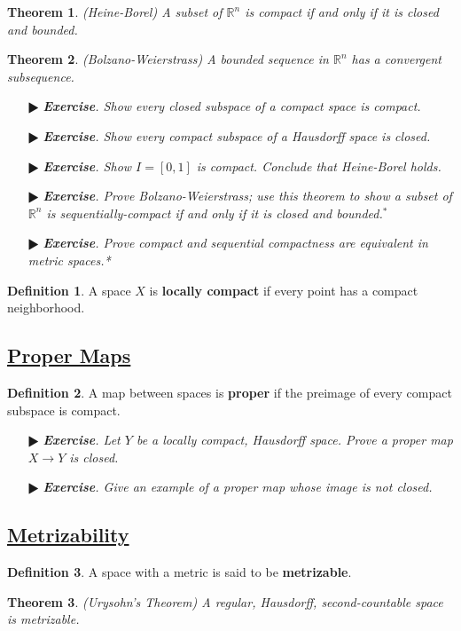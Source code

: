 \documentclass[11pt]{amsart}
\newtheorem*{theorem*}{Theorem}
\theoremstyle{definition}
\newtheorem*{definition*}{Definition}
\renewcommand\:{\colon}
\newcommand{\R}{\mathds{R}}
\newcommand{\1}{\mathds{1}}
\newcommand{\exc}[1]{\vspace{-2.5pt}\begin{itemize}[leftmargin=15pt]\item[$\RHD$] \textit{\textbf{Exercise}. #1}\end{itemize}}
\begin{document}
\begin{theorem*}
	\textnormal{(Heine-Borel)} A subset of $\R^n$ is compact if and only if it is closed and bounded.
\end{theorem*}

\begin{theorem*}
	\textnormal{(Bolzano-Weierstrass)} A bounded sequence in $\R^n$ has a convergent subsequence.
\end{theorem*}

\exc{Show every closed subspace of a compact space is compact.}
\exc{Show every compact subspace of a Hausdorff space is closed.}
\exc{Show $I = [0,1]$ is compact. Conclude that Heine-Borel holds.}
\exc{Prove Bolzano-Weierstrass; use this theorem to show a subset of $\R^n$ is sequentially-compact if and only if it is closed and bounded.$^*$}
\exc{Prove compact and sequential compactness are equivalent in metric spaces.*}

\begin{definition*}
	A space $X$ is \textbf{locally compact} if every point has a compact neighborhood.
\end{definition*}

\vskip20pt



\subsection*{\underline{Proper Maps}}

\begin{definition*}
	A map between spaces is \textbf{proper} if the preimage of every compact subspace is compact.
\end{definition*}

\exc{Let $Y$ be a locally compact, Hausdorff space. Prove a proper map $X \to Y$ is closed.}
\exc{Give an example of a proper map whose image is not closed.}

\vskip20pt



\subsection*{\underline{Metrizability}}

\begin{definition*}
	A space with a metric is said to be \textbf{metrizable}.
\end{definition*}

\begin{theorem*}
	\textnormal{(Urysohn's Theorem)} A regular, Hausdorff, second-countable space is metrizable.
\end{theorem*}
\end{document}
